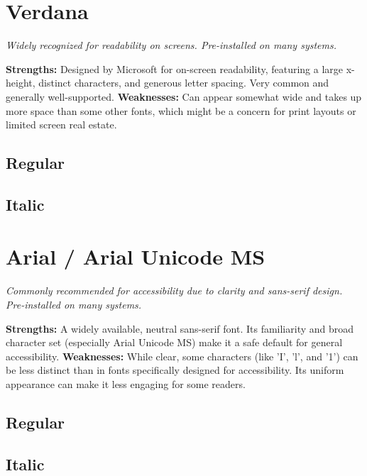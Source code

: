 \pagebreak
\section{Verdana}
\emph{Widely recognized for readability on screens. Pre-installed on many systems.}
\begin{raggedright}
\textbf{Strengths:} Designed by Microsoft for on-screen readability, featuring a large x-height, distinct characters, and generous letter spacing. Very common and generally well-supported.
\textbf{Weaknesses:} Can appear somewhat wide and takes up more space than some other fonts, which might be a concern for print layouts or limited screen real estate.

\subsection{Regular}
\FontSample{\verdanafont}

\subsection{Italic}
\FontSample{{\verdanafont\itshape}}
\end{raggedright}


\pagebreak
\section{Arial / Arial Unicode MS}
\emph{Commonly recommended for accessibility due to clarity and sans-serif design. Pre-installed on many systems.}
\begin{raggedright}
\textbf{Strengths:} A widely available, neutral sans-serif font. Its familiarity and broad character set (especially Arial Unicode MS) make it a safe default for general accessibility.
\textbf{Weaknesses:} While clear, some characters (like 'I', 'l', and '1') can be less distinct than in fonts specifically designed for accessibility. Its uniform appearance can make it less engaging for some readers.

\subsection{Regular}
\FontSample{\arialfont}

\subsection{Italic}
\FontSample{{\arialfont\itshape}}
\end{raggedright}


